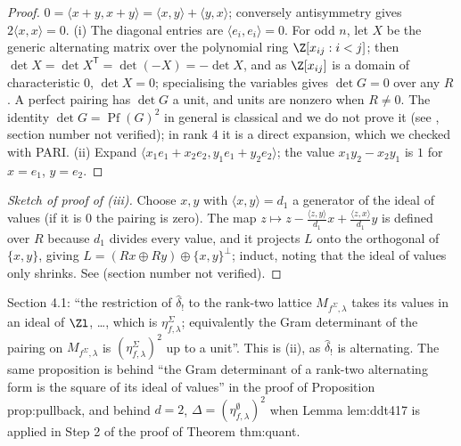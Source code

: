 \begin{proof}
$0=\langle x+y,x+y\rangle=\langle x,y\rangle+\langle y,x\rangle$; conversely antisymmetry gives $2\langle x,x\rangle=0$.
(i) The diagonal entries are $\langle e_i,e_i\rangle=0$. For odd $n$, let $X$ be the generic alternating matrix over the polynomial ring
$\Z[x_{ij}:i<j]$; then $\det X=\det X^{\mathsf T}=\det(-X)=-\det X$, and as $\Z[x_{ij}]$ is a domain of characteristic $0$, $\det X=0$; specialising the
variables gives $\det G=0$ over any $R$. A perfect pairing has $\det G$ a unit, and units are nonzero when $R\ne0$. The identity $\det G=\operatorname{Pf}(G)^2$
in general is classical and we do not prove it (see \cite[Chapter XV, Section 9]{Lang}, section number not verified); in rank $4$ it is a
direct expansion, which we checked with PARI.
(ii) Expand $\langle x_1e_1+x_2e_2,y_1e_1+y_2e_2\rangle$; the value $x_1y_2-x_2y_1$ is $1$ for $x=e_1$, $y=e_2$.
\end{proof}

\begin{proof}[Sketch of proof of (iii)]
Choose $x,y$ with $\langle x,y\rangle=d_1$ a generator of the ideal of values (if it is $0$ the pairing is zero). The map
$z\mapsto z-\frac{\langle z,y\rangle}{d_1}x+\frac{\langle z,x\rangle}{d_1}y$ is defined over $R$ because $d_1$ divides every value, and it projects $L$ onto the orthogonal of
$\{x,y\}$, giving $L=(Rx\oplus Ry)\oplus\{x,y\}^\perp$; induct, noting that the ideal of values only shrinks. See \cite[Chapter XV, Section 8]{Lang}
(section number not verified).
\end{proof}

\begin{paperlink}\label{pl:modules:alternating}
Section 4.1: ``the restriction of $\hat\delta_!$ to the rank-two lattice $M_{f^\Sigma,\lambda}$ takes its values in an ideal of $\Zl$, \dots, which is
$\eta^\Sigma_{f,\lambda}$; equivalently the Gram determinant of the pairing on $M_{f^\Sigma,\lambda}$ is $(\eta^\Sigma_{f,\lambda})^2$ up to a unit''. This is
(ii), as $\hat\delta_!$ is alternating. The same proposition is behind ``the Gram determinant of a rank-two alternating
form is the square of its ideal of values'' in the proof of Proposition prop:pullback, and behind $d=2$, $\Delta=(\eta^\emptyset_{f,\lambda})^2$ when Lemma
lem:ddt417 is applied in Step 2 of the proof of Theorem thm:quant.
\end{paperlink}

